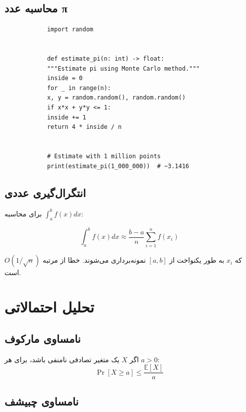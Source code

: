 \documentclass{matinbook}
\begin{document}
    \subsection{محاسبه عدد π}
    
    \begin{latin}
        \begin{verbatim}
            import random
            
            
            def estimate_pi(n: int) -> float:
            """Estimate pi using Monte Carlo method."""
            inside = 0
            for _ in range(n):
            x, y = random.random(), random.random()
            if x*x + y*y <= 1:
            inside += 1
            return 4 * inside / n
            
            
            # Estimate with 1 million points
            print(estimate_pi(1_000_000))  # ~3.1416
        \end{verbatim}
    \end{latin}
    \label{code:monte-carlo-pi}
    
    \subsection{انتگرال‌گیری عددی}
    
    برای محاسبه $\int_{a}^{b} f(x) dx$:
    
    \[
    \int_{a}^{b} f(x) dx \approx
    \frac{b-a}{n} \sum_{i=1}^{n} f(x_{i})
    \]
    
    که $x_{i}$ به طور یکنواخت از $[a, b]$
    نمونه‌برداری می‌شوند. خطا از مرتبه $O(1/\sqrt{n})$ است.
    
    \section{تحلیل احتمالاتی}
    
    \subsection{نامساوی مارکوف}
    
    \begin{theorem}
        اگر $X$ یک متغیر تصادفی نامنفی باشد،
        برای هر $a > 0$:
        \[
        \Pr[X \geq a] \leq \frac{\mathbb{E}[X]}{a}
        \]
        \label{thm:markov}
    \end{theorem}
    
    \subsection{نامساوی چبیشف}
    
\end{document}
